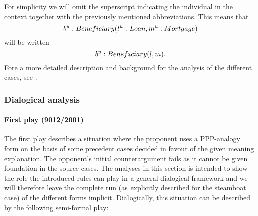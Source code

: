 			For simplicity we will omit the superscript indicating the individual in the context together with the previously mentioned abbreviations. This means that 
			\[ b^u: Beneficiary\index{beneficiary} (l^u: Loan, m^u: Mortgage) \] 
			will be written 
			\[ b^u: Beneficiary\index{beneficiary}(l,m). \]
			Fore a more detailed description and background for the analysis of the different cases, see \textcite{martinez2022elements}.
			
		\subsubsection{Dialogical analysis}	
			
			\paragraph{First play (9012/2001)}
			
				The first play describes a situation where the proponent uses a PPP-analogy form on the basis of some precedent cases decided in favour of the given meaning explanation. The opponent's initial counterargument fails as it cannot be given foundation in the source cases. The analyses in this section is intended to show the role the introduced rules can play in a general dialogical framework and we will therefore leave the complete run (as explicitly described for the steamboat case) of the different forms implicit. Dialogically, this situation can be described by the following semi-formal play:

